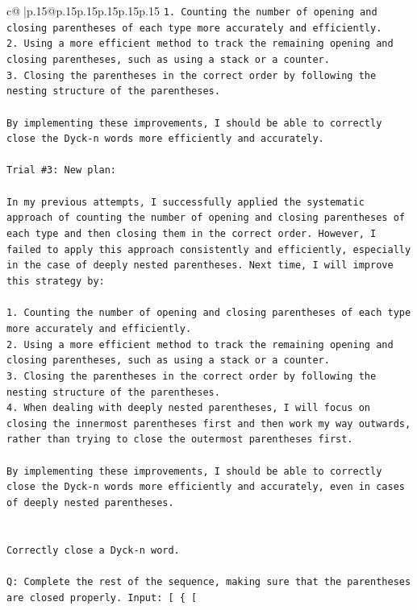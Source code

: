\documentclass{article}
\begin{document}
{\begin{supertabular}{c@{$\;$}|p{.15\linewidth}@{}p{.15\linewidth}p{.15\linewidth}p{.15\linewidth}p{.15\linewidth}p{.15\linewidth}}
{{{\texttt{1. Counting the number of opening and closing parentheses of each type more accurately and efficiently.} \\
\texttt{2. Using a more efficient method to track the remaining opening and closing parentheses, such as using a stack or a counter.} \\
\texttt{3. Closing the parentheses in the correct order by following the nesting structure of the parentheses.} \\
\\ 
\texttt{By implementing these improvements, I should be able to correctly close the Dyck{-}n words more efficiently and accurately.} \\
\\ 
\texttt{Trial \#3: New plan: } \\
\\ 
\texttt{In my previous attempts, I successfully applied the systematic approach of counting the number of opening and closing parentheses of each type and then closing them in the correct order. However, I failed to apply this approach consistently and efficiently, especially in the case of deeply nested parentheses. Next time, I will improve this strategy by:} \\
\\ 
\texttt{1. Counting the number of opening and closing parentheses of each type more accurately and efficiently.} \\
\texttt{2. Using a more efficient method to track the remaining opening and closing parentheses, such as using a stack or a counter.} \\
\texttt{3. Closing the parentheses in the correct order by following the nesting structure of the parentheses.} \\
\texttt{4. When dealing with deeply nested parentheses, I will focus on closing the innermost parentheses first and then work my way outwards, rather than trying to close the outermost parentheses first.} \\
\\ 
\texttt{By implementing these improvements, I should be able to correctly close the Dyck{-}n words more efficiently and accurately, even in cases of deeply nested parentheses.} \\
\\ 
\\ 
\texttt{Correctly close a Dyck{-}n word.} \\
\\ 
\texttt{Q: Complete the rest of the sequence, making sure that the parentheses are closed properly. Input: {[} \{ {[}} \\
}}}
\end{supertabular}}
\end{document}
